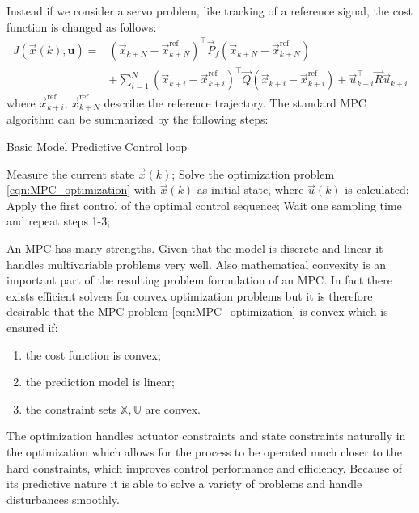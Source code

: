 Instead if we consider a servo problem, like tracking of a reference signal, the cost function is changed as follows:
\begin{equation}
\label{eqn:MPC_cost_function_servo}
\begin{aligned}
J(\vec{x}(k), \textbf{u})=& (\vec{x}_{k+N}-\vec{x}^\text{ref}_{k+N})^\intercal\vec{P}_f(\vec{x}_{k+N}-\vec{x}^\text{ref}_{k+N})\\
&+\sum_{i=1}^{N}(\vec{x}_{k+i}-\vec{x}^\text{ref}_{k+i})^\intercal\vec{Q}(\vec{x}_{k+i}-\vec{x}^\text{ref}_{k+i})+\vec{u}_{k+i}^\intercal\vec{R}\vec{u}_{k+i}
\end{aligned}
\end{equation}
where $\vec{x}^\text{ref}_{k+i}$, $\vec{x}^\text{ref}_{k+N}$ describe the reference trajectory. The standard MPC algorithm can be summarized by the following steps:
\begin{algorithm}%
	\caption{Basic Model Predictive Control loop}
	\small
	\begin{algorithmic}[1]
		\State Measure the current state $\vec{x}(k)$;
		\State Solve the optimization problem \ref{eqn:MPC_optimization} with $\vec{x}(k)$ as initial state, where $\vec{u}(k)$ is calculated;
		\State Apply the first control of the optimal control sequence;
		\State Wait one sampling time and repeat steps 1-3;
	\end{algorithmic}
	\label{alg:MPCloop}
\end{algorithm}

An MPC has many strengths. Given that the model is discrete and linear it handles multivariable problems very well. Also mathematical convexity is an important part of the resulting problem formulation of an MPC. In fact there exists efficient solvers for convex optimization problems but it is therefore desirable that the MPC problem \ref{eqn:MPC_optimization} is convex which is ensured if:
\begin{enumerate}
\item the cost function is convex;
\item the prediction model is linear;
\item the constraint sets $\mathbb{X}, \mathbb{U}$ are convex.	
\end{enumerate}	
The optimization handles actuator constraints and state constraints naturally in the optimization which allows for
the process to be operated much closer to the hard constraints, which improves control performance and efficiency. Because of its predictive nature it is able to solve a variety of problems and handle disturbances smoothly.

